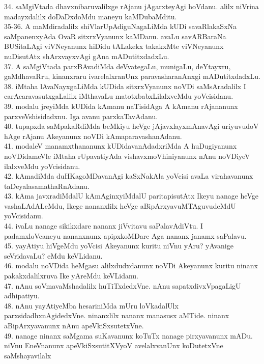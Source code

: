 \documentclass{article}
\begin{document}
34. saMgiVtada dhavxnibaruvalilxge rAjanu jAgarxteyAgi hoVdanu. alilx niVrina madayxdalilx doDaDxdoMdu maneyu kaMDubaMditu.\\
35-36. A maMdiradalilx shiVlarUpAdiguNagaLiMda kUDi savaRlakaSxNa saMpanenxyAda OvaR sitxrxVyanunx kaMDanu. avaLu savARBaraNa BUSitaLAgi viVNeyanunx hiDidu tALakekx takakxMte viVNeyanunx nuDisutAtx shArxvayxvAgi gAna mADutitxdadxLu.\\
37. A saMgiVtada parxBAvadiMda deVvategaLu, munigaLu, deYtayxru, gaMdhavaRru, kinanxraru ivarelalxranUnx paravasharanAnxgi mADutitxdadxLu.\\
38. iMtaha lAvaNayxgaLiMda kUDida sitxrxVyanunx noVDi saMsAradalilx I carAcaravasutxgaLalilx iMthavaLu matotxbabxLilalxveMdu yoVcisidanu.\\
39. modalu jreyiMda kUDida kAmanu naTisidAga A kAmanu rAjananunx parxveVshisidadxnu. Iga avanu parxkaTavAdanu.\\
40. tupapxda saMpakaRdiMda beMkiyu heVge jAjavxlayxmAnavAgi uriyuvudoV hAge rAjanu Akeyanunx noVDi kAmaparavashanAdanu.\\
41. modaleV manamxthananunx kUDidavanAdadxriMda A huDugiyanunx noVDidameVle iMtaha rUpavatiyAda vishavxmoVhiniyanunx nAnu noVDiyeV ilalxveMdu yoVcisidanu.\\
42. kAmadiMda duHKagoMDavanAgi kaSxNakAla yoVcisi avaLa virahavanunx taDeyalasamathaRnAdanu.\\
43. kAma javxradiMdalU kAmAginxyiMdalU paritapisutAtx Ikeyu nanage heVge vashaLAdALeMdu, Ikege nananxlilx heVge aBipArxyavuMTAguvudeMdU yoVcisidanu.\\
44. ivaLu nanage sikikxdare nananx jiVvitavu saPalavAdiVtu. I padamxloVcaneyu nananxnunx apipxkoMDare Aga nananx janamx saPalavu.\\
45. yayAtiyu hiVgeMdu yoVcisi Akeyanunx kuritu niVnu yAru? yAvanige seVridavaLu? eMdu keVLidanu.\\
46. modalu noVDida heMgasu alilxdudxdanunx noVDi Akeyanunx kuritu ninanx pakakxdalilxruva Ike yAreMdu keVLidanu.\\
47. nAnu soVmavaMshadalilx huTiTxdedxVne. nAnu sapatxdivxVpagaLigU adhipatiyu.\\
48. nAnu yayAtiyeMba hesariniMda mUru loVkadalUlx parxsidadhxnAgidedxVne. ninanxlilx nananx manasusx aMTide. ninanx aBipArxyavanunx nAnu apeVkiSxsutetxVne.\\
49. nanage ninanx saMgama suKavanunx koTuTx nanage pirxyavanunx mADu. niVnu EneVnanunx apeVkiSxsutitXVyoV avelalxvanUnx koDutetxVne saMshayavilalx\\
\end{document}
